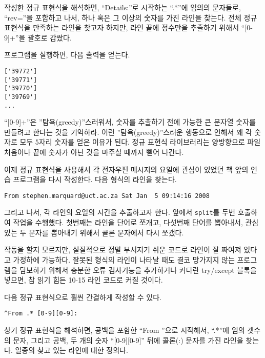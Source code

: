 작성한 정규 표현식을 해석하면, ``Details:''로 시작하는 ``.*''에 임의의 문자들로, ``rev=''을 포함하고 나서, 하나 혹은 그 이상의 숫자를 가진 라인을 찾는다.
전체 정규 표현식을 만족하는 라인을 찾고자 하지만, 라인 끝에 정수만을 추출하기 위해서 ``[0-9]+''을 괄호로 감쌌다.

프로그램을 실행하면, 다음 출력을 얻는다.

\beforeverb
\begin{verbatim}
['39772']
['39771']
['39770']
['39769']
...
\end{verbatim}
\afterverb
%

``[0-9]+''은 ''탐욕(greedy)''스러워서, 숫자를 추출하기 전에 가능한 큰 문자열 숫자를 만들려고 한다는 것을 기억하라.
이런 ''탐욕(greedy)''스러운 행동으로 인해서 왜 각 숫자로 모두 5자리 숫자를 얻은 이유가 된다.
정규 표현식 라이브러리는 양방향으로 파일 처음이나 끝에 숫자가 아닌 것을 마주칠 때까지 뻗어 나간다.

이제 정규 표현식을 사용해서 각 전자우편 메시지의 요일에 관심이 있었던 책 앞의 연습 프로그램을 다시 작성한다.
다음 형식의 라인을 찾는다.

\beforeverb
\begin{verbatim}
From stephen.marquard@uct.ac.za Sat Jan  5 09:14:16 2008
\end{verbatim}
\afterverb
%

그리고 나서, 각 라인의 요일의 시간을 추출하고자 한다. 
앞에서 {\tt split}를 두번 호출하여 작업을 수행했다. 첫번째는 라인을 단어로 쪼개고, 다섯번째 단어를 뽑아내서,
관심있는 두 문자를 뽑아내기 위해서 콜론 문자에서 다시 쪼갰다.


작동을 할지 모르지만, 실질적으로 정말 부서지기 쉬운 코드로 라인이 잘 짜여져 있다고 가정하에 가능하다. 
잘못된 형식의 라인이 나타날 때도 결코 망가지지 않는 프로그램을 담보하기 위해서 충분한 오류 검사기능을 추가하거나 커다란 try/except 블록을 넣으면, 참 읽기 힘든 10-15 라인 코드로 커질 것이다.

다음 정규 표현식으로 훨씬 간결하게 작성할 수 있다.

\beforeverb
\begin{verbatim}
^From .* [0-9][0-9]:
\end{verbatim}
\afterverb
%

상기 정규 표현식을 해석하면, 공백을 포함한 ``From ''으로 시작해서, ``.*''에 임의 갯수의 문자, 그리고 공백, 두 개의 숫자 ``[0-9][0-9]'' 뒤에 콜론(:) 문자를 가진 라인을 찾는다. 
일종의 찾고 있는 라인에 대한 정의다. 

